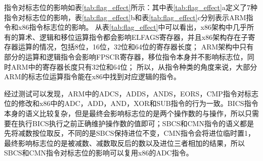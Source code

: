 
指令对标志位的影响如表\ref{tab:flag_effect}所示：其中表\ref{tab:flag_effect}a定义了7种指令对标志位的影响，表\ref{tab:flag_effect}b和表\ref{tab:flag_effect}c分别表示ARM指令和x86指令标志位的影响。
从表\ref{tab:flag_effect}中可以看出，x86架构中几乎所有的算术、逻辑和移位运算指令都会影响ELFAGS寄存器，并且x86架构存在子寄存器运算的情况，包括8位，16位，32位和64位的寄存器长度；
ARM架构中只有部分的运算和逻辑指令会影响FPSCR寄存器，移位指令本身并不影响标志位，同时ARM中的寄存器长度只有32位和64位；
所以，从指令种类的角度来说，大部分ARM的标志位运算指令能在x86中找到对应逻辑的指令。

经过测试可以发现，ARM中的ADCS，ADDS，ANDS，EORS，CMP指令对标志位的修改和x86中的ADC，ADD，AND，XOR和SUB指令的行为一致。BICS指令本身的语义比较复杂，但是最终会影响标志位的是两个操作数的与操作，所以只需要在执行BICS执行之前正确维护操作数的值即可；SBCS和CMN指令的语义都是先将减数按位取反，不同的是SBCS保持进位不变，CMN指令会将进位临时置1，最终影响标志位的是被减数、减数取反后的数以及进位三者相加的结果，所以SBCS和CMN指令对标志位的影响可以复用x86的ADC指令。

